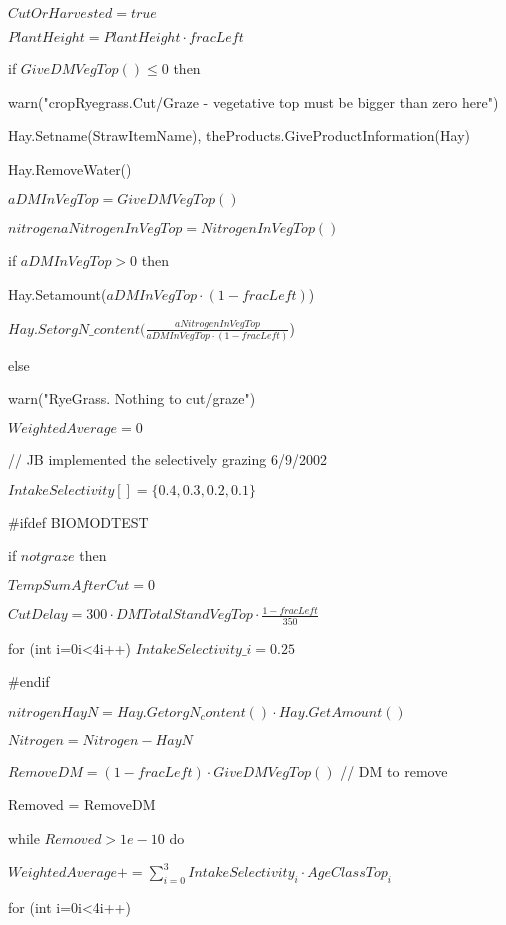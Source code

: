 \documentclass[%
]{scrartcl}
\begin{document}
 $CutOrHarvested = true$

   $PlantHeight = PlantHeight \cdot fracLeft$

   if $GiveDMVegTop() \le 0$ then

\quad      warn("cropRyegrass.Cut/Graze - vegetative top must be bigger than zero here")

   Hay.Setname(StrawItemName),
   theProducts.GiveProductInformation(Hay)

   Hay.RemoveWater()

   $aDMInVegTop = GiveDMVegTop()$

   $nitrogen aNitrogenInVegTop = NitrogenInVegTop()$

   if $aDMInVegTop > 0$ then
  
\quad 		Hay.Setamount($aDMInVegTop \cdot (1-fracLeft)$)
      
\quad $Hay.SetorgN\_content(\tfrac{aNitrogenInVegTop}{aDMInVegTop \cdot (1-fracLeft)}$)   
   
   else
   
\quad 	warn("RyeGrass. Nothing to cut/graze")


   $WeightedAverage = 0 $                      

 //  JB implemented the selectively grazing 6/9/2002
  
 $IntakeSelectivity [] = \{0.4,0.3,0.2,0.1\}$

\#ifdef BIOMODTEST

if $ not graze$ then
   
  \quad    $ TempSumAfterCut = 0   $                 
      
\quad  $CutDelay = 300 \cdot DMTotalStandVegTop  \cdot \tfrac{1-fracLeft}{350} $     
\citep[Eq. 12]{berntsen2005simulation}


      
\quad  for (int i=0i<4i++) $IntakeSelectivity\_i = 0.25$
   
\#endif
  
      $nitrogen HayN =  Hay.GetorgN_content()  \cdot  Hay.GetAmount()$

   $Nitrogen = Nitrogen - HayN$

  $ RemoveDM = (1-fracLeft)  \cdot  GiveDMVegTop()$       //  DM to remove
	
Removed = RemoveDM
	
while $Removed>1e-10$ do
    

  \quad 	$WeightedAverage += \sum_{i=0}^3 IntakeSelectivity_i \cdot AgeClassTop_i$

   \quad 	for (int i=0i<4i++)
   	
\end{document}
